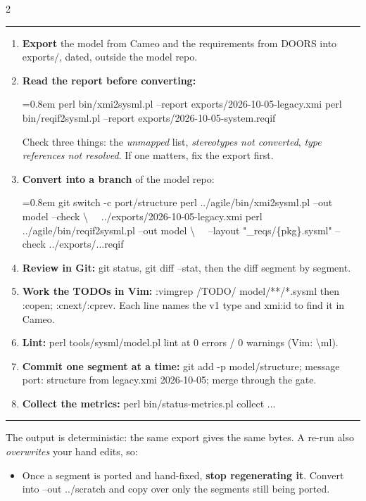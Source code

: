 \documentclass[letterpaper]{article}
\newcommand{\head}[1]{\par\vspace{7pt}{\sffamily\bfseries\large #1}\par\vspace{1pt}\hrule\vspace{4pt}}
\newcommand{\cmd}[1]{{\footnotesize\ttfamily #1}}
\newenvironment{cmds}{\par\vspace{1pt}\footnotesize\ttfamily\obeylines\leftskip=0.8em\parskip=0pt}{\par\vspace{2pt}}
\begin{document}
\begin{multicols}{2}
\head{The daily loop}
\begin{enumerate}
\item \textbf{Export} the model from Cameo and the requirements from DOORS into \cmd{exports/}, dated, outside the model repo.
\item \textbf{Read the report before converting:}
\begin{cmds}
perl bin/xmi2sysml.pl --report exports/2026-10-05-legacy.xmi
perl bin/reqif2sysml.pl --report exports/2026-10-05-system.reqif
\end{cmds}
Check three things: the \emph{unmapped} list, \emph{stereotypes not converted}, \emph{type references not resolved}. If one matters, fix the export first.
\item \textbf{Convert into a branch} of the model repo:
\begin{cmds}
git switch -c port/structure
perl ../agile/bin/xmi2sysml.pl --out model --check \textbackslash
\ \ ../exports/2026-10-05-legacy.xmi
perl ../agile/bin/reqif2sysml.pl --out model \textbackslash
\ \ --layout "\_reqs/\{pkg\}.sysml" --check ../exports/...reqif
\end{cmds}
\item \textbf{Review in Git:} \cmd{git status}, \cmd{git diff --stat}, then the diff segment by segment.
\item \textbf{Work the TODOs in Vim:} \cmd{:vimgrep /TODO/ model/**/*.sysml} then \cmd{:copen}; \cmd{:cnext}/\cmd{:cprev}. Each line names the v1 type and \cmd{xmi:id} to find it in Cameo.
\item \textbf{Lint:} \cmd{perl tools/sysml/model.pl lint} at 0 errors / 0 warnings (Vim: \cmd{\textbackslash ml}).
\item \textbf{Commit one segment at a time:} \cmd{git add -p model/structure}; message \cmd{port: structure from legacy.xmi 2026-10-05}; merge through the gate.
\item \textbf{Collect the metrics:} \cmd{perl bin/status-metrics.pl collect ...}
\end{enumerate}
\begin{minipage}{\linewidth}\head{Keep hand edits safe}
The output is deterministic: the same export gives the same bytes. A re-run also \emph{overwrites} your hand edits, so:
\begin{itemize}
\item Once a segment is ported and hand-fixed, \textbf{stop regenerating it}. Convert into \cmd{--out ../scratch} and copy over only the segments still being ported.

\end{itemize}
\end{minipage}
\end{multicols}
\end{document}
